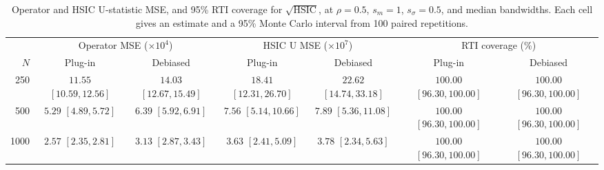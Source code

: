 \begin{table}[htbp]
\centering\small
\caption{Operator and HSIC U-statistic MSE, and 95\% RTI coverage for $\sqrt{\mathrm{HSIC}}$, at $\rho=0.5$, $s_m=1$, $s_\sigma=0.5$, and median bandwidths. Each cell gives an estimate and a 95\% Monte Carlo interval from 100 paired repetitions.}
\label{tab:debiasing-mse-rho0p5}
\setlength{\tabcolsep}{4pt}\renewcommand{\arraystretch}{1.3}
\begin{tabular}{@{}rcccccc@{}}\toprule
& \multicolumn{2}{c}{Operator MSE ($\times 10^{4}$)} & \multicolumn{2}{c}{HSIC U MSE ($\times 10^{7}$)} & \multicolumn{2}{c}{RTI coverage (\%)}\\
\cmidrule(lr){2-3}\cmidrule(lr){4-5}\cmidrule(l){6-7}
$N$ & Plug-in & Debiased & Plug-in & Debiased & Plug-in & Debiased\\\midrule
250 & \shortstack{$11.55$\\{\scriptsize $[10.59,12.56]$}} & \shortstack{$14.03$\\{\scriptsize $[12.67,15.49]$}} & \shortstack{$18.41$\\{\scriptsize $[12.31,26.70]$}} & \shortstack{$22.62$\\{\scriptsize $[14.74,33.18]$}} & \shortstack{$100.00$\\{\scriptsize $[96.30,100.00]$}} & \shortstack{$100.00$\\{\scriptsize $[96.30,100.00]$}}\\[3pt]
500 & \shortstack{$5.29$\\{\scriptsize $[4.89,5.72]$}} & \shortstack{$6.39$\\{\scriptsize $[5.92,6.91]$}} & \shortstack{$7.56$\\{\scriptsize $[5.14,10.66]$}} & \shortstack{$7.89$\\{\scriptsize $[5.36,11.08]$}} & \shortstack{$100.00$\\{\scriptsize $[96.30,100.00]$}} & \shortstack{$100.00$\\{\scriptsize $[96.30,100.00]$}}\\[3pt]
1000 & \shortstack{$2.57$\\{\scriptsize $[2.35,2.81]$}} & \shortstack{$3.13$\\{\scriptsize $[2.87,3.43]$}} & \shortstack{$3.63$\\{\scriptsize $[2.41,5.09]$}} & \shortstack{$3.78$\\{\scriptsize $[2.34,5.63]$}} & \shortstack{$100.00$\\{\scriptsize $[96.30,100.00]$}} & \shortstack{$100.00$\\{\scriptsize $[96.30,100.00]$}}\\[3pt]
\bottomrule\end{tabular}
\end{table}
